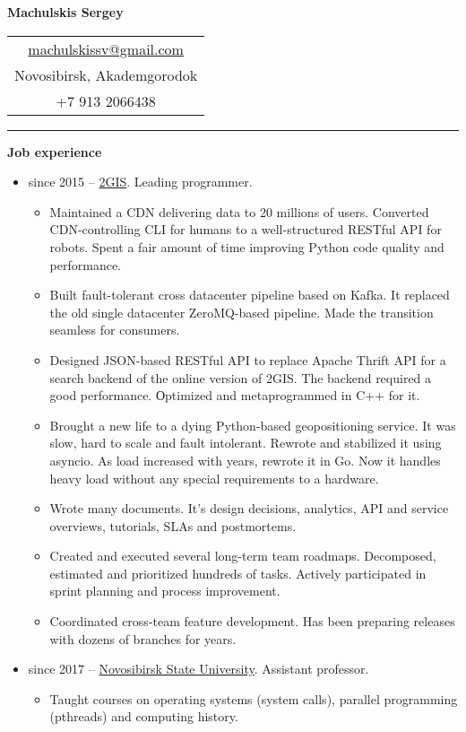 \documentclass[final]{letter}
\begin{document}
\begin{center}

{\fontsize{25}{40}\selectfont\bf{Machulskis Sergey}}
  {\hfill
    \begin{tabular}{c}
        \href{mailto:machulskissv@gmail.com}{machulskissv@gmail.com}\\
        Novosibirsk, Akademgorodok \\
        +7 913 2066438\\
     \end{tabular}
  }
\rule{.98\textwidth}{1pt}

\addvspace{.1cm}

\end{center}

{\bf Job experience}
\begin{itemize}
  \item since 2015 -- \href{https://2gis.com}{2GIS}. Leading programmer.
  \begin{itemize}
  \item Maintained a CDN delivering data to 20 millions of users.
    Converted CDN-controlling CLI for humans to a well-structured RESTful API for robots.
    Spent a fair amount of time improving Python code quality and performance.
  \item Built fault-tolerant cross datacenter pipeline based on Kafka.
    It replaced the old single datacenter ZeroMQ-based pipeline. Made the transition seamless for consumers.
  \item Designed JSON-based RESTful API to replace Apache Thrift API for a search backend of the online version of 2GIS.
    The backend required a good performance. Оptimized and metaprogrammed in C++ for it.
  \item Brought a new life to a dying Python-based geopositioning service. It was slow, hard to scale and fault intolerant.
    Rewrote and stabilized it using asyncio. As load increased with years, rewrote it in Go. Now it handles heavy load without any special requirements to a hardware.
  \item Wrote many documents. It's design decisions, analytics, API and service overviews, tutorials, SLAs and postmortems.
  \item Created and executed several long-term team roadmaps. Decomposed, estimated and prioritized hundreds of tasks.
  Actively participated in sprint planning and process improvement.
  \item Coordinated cross-team feature development. Has been preparing releases with dozens of branches for years.
  \end{itemize}

  \item since 2017 -- \href{http://fit.nsu.ru/}{Novosibirsk State University}. Assistant professor.
    \begin{itemize}
      \item Taught courses on operating systems (system calls), parallel programming (pthreads) and computing history.
    \end{itemize}
  \end{itemize}
\end{document}
